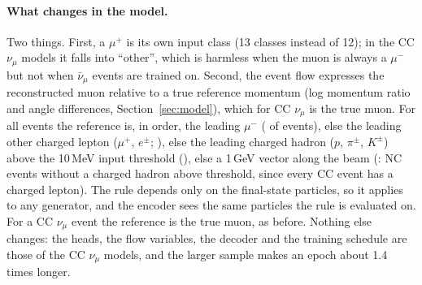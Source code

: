 \documentclass[11pt]{article}
\begin{document}
\begin{table}[h]\centering\small

\caption{Composition of the all-events population (true vertex in the training volume) and of its test split.
``other'' is the handful of events without a CC or NC label.}
\label{tab:ae-comp}
\end{table}

\paragraph{What changes in the model.} Two things. First, a $\mu^+$ is its own input class (13 classes instead of
12); in the CC $\nu_\mu$ models it falls into ``other'', which is harmless when the muon is always a $\mu^-$ but
not when $\bar\nu_\mu$ events are trained on. Second, the event flow expresses the reconstructed muon relative to
a true reference momentum (log momentum ratio and angle differences, Section~\ref{sec:model}), which for CC
$\nu_\mu$ is the true muon. For all events the reference is, in order, the leading $\mu^-$
(\nAERefMu{} of events), else the leading other charged lepton ($\mu^+$, $e^\pm$; \nAERefLepton{}), else the
leading charged hadron ($p$, $\pi^\pm$, $K^\pm$) above the 10\,MeV input threshold (\nAERefHadron{}), else a
1\,GeV vector along the beam (\nAERefBeam{}: NC events without a charged hadron above threshold, since every CC event has a charged lepton).
The rule depends only on the final-state particles, so it applies to any generator, and the encoder sees the
same particles the rule is evaluated on. For a CC $\nu_\mu$ event the reference is the true muon, as before.
Nothing else changes: the heads, the flow variables, the decoder and the training schedule are those of the CC
$\nu_\mu$ models, and the larger sample makes an epoch about 1.4 times longer.
\end{document}
